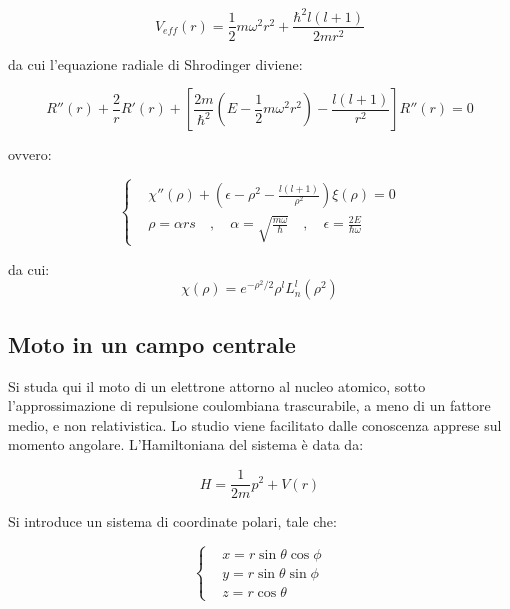 \documentclass{article}
\begin{document}
\begin{equation}
    V_{eff}(r)=\frac{1}{2}m\omega^2r^2+\frac{\hbar^2l(l+1)}{2mr^2}
\end{equation}

da cui l'equazione radiale di Shrodinger diviene:

\begin{equation}
    R''(r)+\frac{2}{r}R'(r)+\left[\frac{2m}{\hbar^2}\left(E-\frac{1}{2}m\omega^2r^2\right)-\frac{l(l+1)}{r^2}\right]R''(r)=0
\end{equation}

ovvero:

\begin{equation}
    \left\{
    \begin{aligned}
         & \chi''(\rho)+\left(\epsilon -\rho^2-\frac{l(l+1)}{\rho^2}\right)\xi(\rho)=0                                     \\
         & \rho=\alpha rs \quad , \quad \alpha=\sqrt{\frac{m\omega}{\hbar}} \quad , \quad \epsilon=\frac{2E}{\hbar \omega}
    \end{aligned}
    \right.
\end{equation}

da cui:
\begin{equation}
    \chi(\rho)=e^{-\rho^2/2} \rho^l L_n^l(\rho^2)
\end{equation}




\subsection{Moto in un campo centrale}
Si studa qui il moto di un elettrone attorno al nucleo atomico, sotto l'approssimazione di repulsione coulombiana trascurabile, a meno di un fattore medio, e non relativistica.
Lo studio viene facilitato dalle conoscenza apprese sul momento angolare.
L'Hamiltoniana del sistema è data da:

\begin{equation}
    H=\frac{1}{2m}p^2+V(r)
\end{equation}

Si introduce un sistema di coordinate polari, tale che:

\begin{equation}
    \left\{
    \begin{aligned}
         & x=r\sin{\theta}\cos{\phi} \\
         & y=r\sin{\theta}\sin{\phi} \\
         & z=r\cos{\theta}
    \end{aligned}
    \right.
\end{equation}
\end{document}
